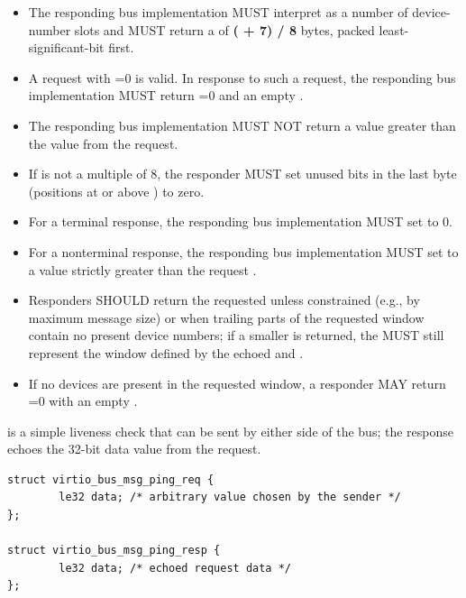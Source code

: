 \begin{itemize}
  \item The responding bus implementation MUST interpret  as a
        number of
        device-number slots and MUST return a  of
        \textbf{( + 7) / 8} bytes, packed least-significant-bit
        first.
  \item A request with =0 is valid. In response to such a request,
        the responding bus implementation MUST return =0 and an
        empty .
  \item The responding bus implementation MUST NOT return a  value
        greater
        than the  value from the request.
  \item If  is not a multiple of 8, the responder MUST set unused
        bits in the last  byte (positions at or above
        ) to zero.
  \item For a terminal response, the responding bus implementation MUST set
         to 0.
  \item For a nonterminal response, the responding bus implementation MUST set
         to a value strictly greater than the request
        .
  \item Responders SHOULD return the requested  unless constrained
        (e.g., by maximum message size) or when trailing parts of the requested
        window contain no present device numbers; if a smaller  is
        returned, the  MUST still represent the window defined by
        the echoed  and .
  \item If no devices are present in the requested window, a responder MAY
        return =0 with an empty .
\end{itemize}


 is a simple liveness check that can be sent by either side of the
bus; the response echoes the 32-bit data value from the request.

\begin{lstlisting}
struct virtio_bus_msg_ping_req {
        le32 data; /* arbitrary value chosen by the sender */
};

struct virtio_bus_msg_ping_resp {
        le32 data; /* echoed request data */
};
\end{lstlisting}

